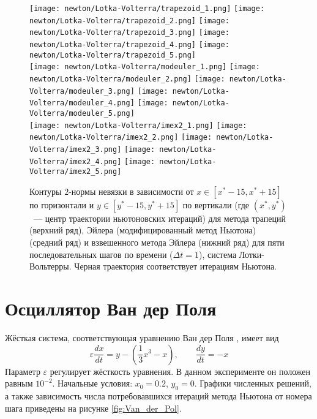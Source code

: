 \begin{figure}[ht!]
	\begin{center}
        \texttt{[image: newton/Lotka-Volterra/trapezoid\_1.png]}
        \texttt{[image: newton/Lotka-Volterra/trapezoid\_2.png]}
        \texttt{[image: newton/Lotka-Volterra/trapezoid\_3.png]}
        \texttt{[image: newton/Lotka-Volterra/trapezoid\_4.png]}
        \texttt{[image: newton/Lotka-Volterra/trapezoid\_5.png]}
        \\[4pt]
        \texttt{[image: newton/Lotka-Volterra/modeuler\_1.png]}
        \texttt{[image: newton/Lotka-Volterra/modeuler\_2.png]}
        \texttt{[image: newton/Lotka-Volterra/modeuler\_3.png]}
        \texttt{[image: newton/Lotka-Volterra/modeuler\_4.png]}
        \texttt{[image: newton/Lotka-Volterra/modeuler\_5.png]}
        \\[4pt]
        \texttt{[image: newton/Lotka-Volterra/imex2\_1.png]}
        \texttt{[image: newton/Lotka-Volterra/imex2\_2.png]}
        \texttt{[image: newton/Lotka-Volterra/imex2\_3.png]}
        \texttt{[image: newton/Lotka-Volterra/imex2\_4.png]}
        \texttt{[image: newton/Lotka-Volterra/imex2\_5.png]}
	\end{center}
    \caption{Контуры $ 2 $-нормы невязки в зависимости от $ x \in [x^* - 15, x^* + 15] $ по горизонтали
        и $ y \in [y^* - 15, y^* + 15] $ по вертикали
        (где $ (x^*, y^*) $~--- центр траектории ньютоновских итераций)
        для метода трапеций (верхний ряд), Эйлера (модифицированный метод Ньютона) (средний ряд) и взвешенного метода Эйлера (нижний ряд)
        для пяти последовательных шагов по времени
        ($ \Delta t = 1 $), система Лотки-Вольтерры.
        Черная траектория соответствует итерациям Ньютона.
	}
	\label{fig:Lotka-Volterra_residual}
\end{figure}



\section{Осциллятор Ван дер Поля}
\label{sec:Van_der_Pol}

Жёсткая система, соответствующая уравнению Ван дер Поля \cite{alexander1991modified}, имеет вид
%
\begin{equation}
    \label{eq:Van_der_Pol}
    \varepsilon \frac{d x}{d t} = y - \left( \frac{1}{3} x^3 - x \right), \qquad \frac{d y}{d t} = -x
\end{equation}
Параметр $ \varepsilon $ регулирует жёсткость уравнения.
В данном эксперименте он положен равным $ 10^{-2} $.
Начальные условия: $ x_0 = 0.2 $, $ y_0 = 0 $.
Графики численных решений, а также зависимость числа потребовавшихся итераций метода Ньютона от номера шага приведены на рисунке \ref{fig:Van_der_Pol}.

